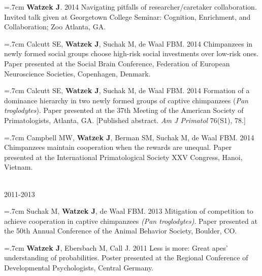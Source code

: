 \documentclass[]{friggeri-cv}
\begin{document}
\hangindent=.7cm \textbf{Watzek J}. 2014 Navigating pitfalls of researcher/caretaker collaboration. Invited talk given at Georgetown College Seminar: Cognition, Enrichment, and Collaboration; Zoo Atlanta, GA.

\hangindent=.7cm Calcutt SE, \textbf{Watzek J}, Suchak M, de Waal FBM. 2014 Chimpanzees in newly formed social groups choose high-risk social investments over low-risk ones. Paper presented at the Social Brain Conference, Federation of European Neuroscience Societies, Copenhagen, Denmark.

\hangindent=.7cm Calcutt SE, \textbf{Watzek J}, Suchak M, de Waal FBM. 2014 Formation of a dominance hierarchy in two newly formed groups of captive chimpanzees (\emph{Pan troglodytes}). Paper presented at the 37th Meeting of the American Society of Primatologists, Atlanta, GA. [Published abstract. \emph{Am J Primatol} 76(S1), 78.]

\hangindent=.7cm Campbell MW, \textbf{Watzek J}, Berman SM, Suchak M, de Waal FBM. 2014 Chimpanzees maintain cooperation when the rewards are unequal. Paper presented at the International Primatological Society XXV Congress, Hanoi, Vietnam.


{\large{} ~\\ 2011-2013}

\hangindent=.7cm Suchak M, \textbf{Watzek J}, de Waal FBM. 2013 Mitigation of competition to achieve cooperation in captive chimpanzees \emph{(Pan troglodytes)}. Paper presented at the 50th Annual Conference of the Animal Behavior Society, Boulder, CO.

\hangindent=.7cm \textbf{Watzek J}, Ebersbach M, Call J. 2011 Less is more: Great apes' understanding of probabilities. Poster presented at the Regional Conference of Developmental Psychologists, Central Germany.\\[-.1cm]


\renewenvironment{aside}{%
  \let\oldsection\section
  \renewcommand{\section}[1]{
    \par\vspace{\baselineskip}{\Large\headingfont\color{headercolor} ##1}
  }
  \begin{textblock}{3.6}(1.5, 1.5)
  \begin{flushright}
  \obeycr
}{%
  \restorecr
  \end{flushright}
  \end{textblock}
  \let\section\oldsection
}
\end{document}
